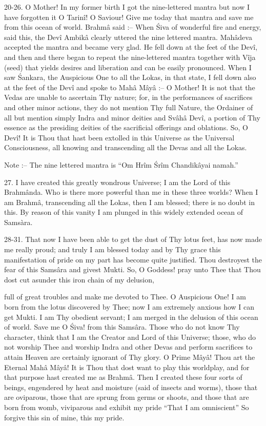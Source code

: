 20-26. O Mother! In my former birth I got the nine-lettered mantra but now I have forgotten it O Tarin\^i! O Saviour! Give me today that mantra and save me from this ocean of world. Brahm\^a said :-- When \'Siva of wonderful fire and energy, said this, the Dev\^i Ambik\^a clearly uttered the nine lettered mantra. Mah\^adeva accepted the mantra and became very glad. He fell down at the feet of the Dev\^i, and then and there began to repeat the nine-lettered mantra together with V\^ija (seed) that yields desires and liberation and can be easily pronounced. When I saw \'Sankara, the Auspicious One to all the Lokas, in that state, I fell down also at the feet of the Dev\^i and spoke to Mah\^a M\^ay\^a :-- O Mother! It is not that the Vedas are unable to ascertain Thy nature; for, in the performances of sacrifices and other minor actions, they do not mention Thy full Nature, the Ordainer of all but mention simply Indra and minor deities and Sv\^ah\^a Dev\^i, a portion of Thy essence as the presiding deities of the sacrificial offerings and oblations. So, O Dev\^i! It is Thou that hast been extolled in this Universe as the Universal Consciousness, all knowing and transcending all the Devas and all the Lokas.

Note :-- The nine lettered mantra is ``Om Hr\^im \'Sr\^im Chandik\^ayai namah.''

27. I have created this greatly wondrous Universe; I am the Lord of this Brahm\^anda. Who is there more powerful than me in these three worlds? When I am Brahm\^a, transcending all the Lokas, then I am blessed; there is no doubt in this. By reason of this vanity I am plunged in this widely extended ocean of Samsàra.

28-31. That now I have been able to get the dust of Thy lotus feet, has now made me really proud; and truly I am blessed today and by Thy grace this manifestation of pride on my part has become quite justified. Thou destroyest the fear of this Sams\^ara and givest Mukti. So, O Goddess! pray unto Thee that Thou dost cut asunder this iron chain of my delusion,

full of great troubles and make me devoted to Thee. O Auspicious One! I am born from the lotus discovered by Thee; now I am extremely anxious how I can get Mukti. I am Thy obedient servant; I am merged in the delusion of this ocean of world. Save me O \'Siva! from this Sams\^ara. Those who do not know Thy character, think that I am the Creator and Lord of this Universe; those, who do not worship Thee and worship Indra and other Devas and perform sacrifices to attain Heaven are certainly ignorant of Thy glory. O Prime M\^ay\^a! Thou art the Eternal Mah\^a M\^ay\^a! It is Thou that dost want to play this worldplay, and for that purpose hast created me as Brahm\^a. Then I created these four sorts of beings, engendered by heat and moisture (said of insects and worms), those that are oviparous, those that are sprung from germs or shoots, and those that are born from womb, viviparous and exhibit my pride ``That I am omniscient'' So forgive this sin of mine, this my pride.


